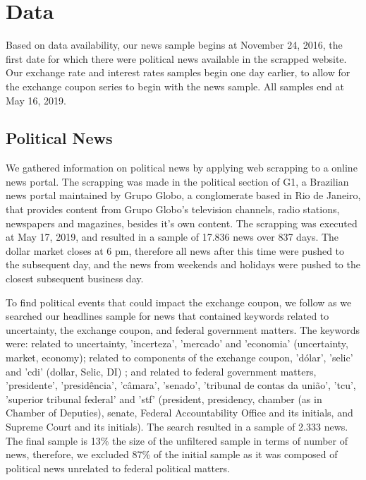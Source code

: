 \documentclass[cic,tc, english]{iiufrgs}
\begin{document}
\section{Data} \label{chapter_data}

    Based on data availability, our news sample begins at November 24, 2016, the first date for which there were political news available in the scrapped website. Our exchange rate and interest rates samples begin one day earlier, to allow for the exchange coupon series to begin with the news sample. All samples end at May 16, 2019.

\subsection{Political News} \label{chapter_political_news}
    
    We gathered information on political news by applying web scrapping to a online news portal. The scrapping was made in the political section of G1, a Brazilian news portal maintained by Grupo Globo, a conglomerate based in Rio de Janeiro, that provides content from Grupo Globo's television channels, radio stations, newspapers and magazines, besides it's own content. The scrapping was executed at May 17, 2019, and resulted in a sample of 17.836 news over 837 days. The dollar market closes at 6 pm, therefore all news after this time were pushed to the subsequent day, and the news from weekends and holidays were pushed to the closest subsequent business day.

    To find political events that could impact the exchange coupon, we follow \citet{bbb} as we searched our headlines sample for news that contained keywords related to uncertainty, the exchange coupon, and federal government matters. The keywords were: related to uncertainty, 'incerteza', 'mercado' and 'economia' (uncertainty, market, economy); related to components of the exchange coupon, 'dólar', 'selic' and 'cdi' (dollar, Selic, DI) ; and related to federal government matters, 'presidente', 'presidência', 'câmara', 'senado', 'tribunal de contas da união', 'tcu', 'superior tribunal federal' and 'stf' (president, presidency, chamber (as in Chamber of Deputies), senate, Federal Accountability Office and its initials, and Supreme Court and its initials). The search resulted in a sample of 2.333 news. The final sample is 13\% the size of the unfiltered sample in terms of number of news, therefore, we excluded 87\% of the initial sample as it was composed of political news unrelated to federal political matters.
\end{document}
